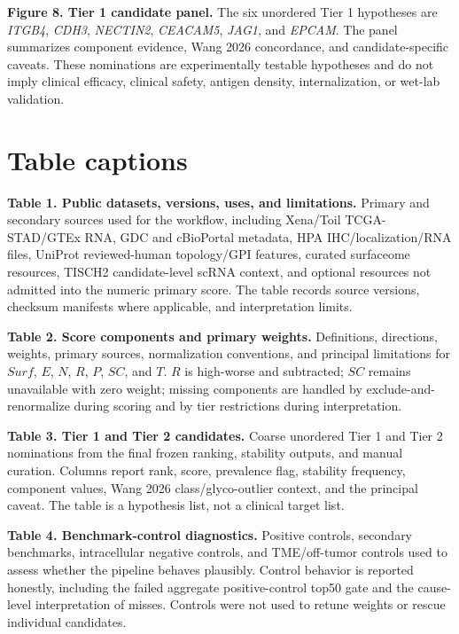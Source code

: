 \documentclass[twocolumn]{article}
\begin{document}
\textbf{Figure 8. Tier 1 candidate panel.} The six unordered Tier 1 hypotheses are \textit{ITGB4}, \textit{CDH3}, \textit{NECTIN2}, \textit{CEACAM5}, \textit{JAG1}, and \textit{EPCAM}. The panel summarizes component evidence, Wang 2026 concordance, and candidate-specific caveats. These nominations are experimentally testable hypotheses and do not imply clinical efficacy, clinical safety, antigen density, internalization, or wet-lab validation.

\section*{Table captions}

\textbf{Table 1. Public datasets, versions, uses, and limitations.} Primary and secondary sources used for the workflow, including Xena/\allowbreak{}Toil TCGA-STAD/\allowbreak{}GTEx RNA, GDC and cBioPortal metadata, HPA IHC/\allowbreak{}localization/\allowbreak{}RNA files, UniProt reviewed-human topology/\allowbreak{}GPI features, curated surfaceome resources, TISCH2 candidate-level scRNA context, and optional resources not admitted into the numeric primary score. The table records source versions, checksum manifests where applicable, and interpretation limits.

\textbf{Table 2. Score components and primary weights.} Definitions, directions, weights, primary sources, normalization conventions, and principal limitations for $Surf$, $E$, $N$, $R$, $P$, $SC$, and $T$. $R$ is high-worse and subtracted; $SC$ remains unavailable with zero weight; missing components are handled by exclude-and-renormalize during scoring and by tier restrictions during interpretation.

\textbf{Table 3. Tier 1 and Tier 2 candidates.} Coarse unordered Tier 1 and Tier 2 nominations from the final frozen ranking, stability outputs, and manual curation. Columns report rank, score, prevalence flag, stability frequency, component values, Wang 2026 class/\allowbreak{}glyco-outlier context, and the principal caveat. The table is a hypothesis list, not a clinical target list.

\textbf{Table 4. Benchmark-control diagnostics.} Positive controls, secondary benchmarks, intracellular negative controls, and TME/\allowbreak{}off-tumor controls used to assess whether the pipeline behaves plausibly. Control behavior is reported honestly, including the failed aggregate positive-control top50 gate and the cause-level interpretation of misses. Controls were not used to retune weights or rescue individual candidates.
\end{document}

